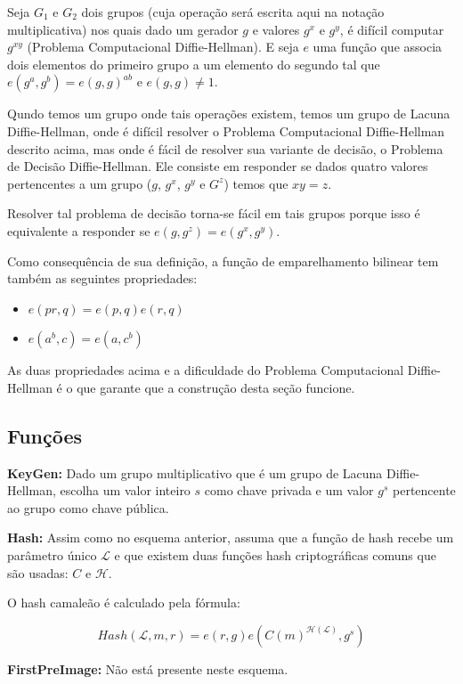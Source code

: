 \documentclass[a4paper]{article}
\begin{document}
Seja $G_1$ e $G_2$ dois grupos (cuja operação será escrita aqui na
notação multiplicativa) nos quais dado um gerador $g$ e valores $g^x$
e $g^y$, é difícil computar $g^{xy}$ (Problema Computacional
Diffie-Hellman). E seja $e$ uma função que associa dois elementos do
primeiro grupo a um elemento do segundo tal que $e(g^a, g^b) = e(g,
g)^{ab}$ e $e(g, g) \neq 1$.

Qundo temos um grupo onde tais operações existem, temos um grupo de
Lacuna Diffie-Hellman, onde é difícil resolver o Problema
Computacional Diffie-Hellman descrito acima, mas onde é fácil de
resolver sua variante de decisão, o Problema de Decisão
Diffie-Hellman. Ele consiste em responder se dados quatro valores
pertencentes a um grupo ($g$, $g^x$, $g^y$ e $G^z$) temos que $xy=z$.

Resolver tal problema de decisão torna-se fácil em tais grupos porque
isso é equivalente a responder se $e(g, g^z) = e(g^x, g^y)$.

Como consequência de sua definição, a função de emparelhamento
bilinear tem também as seguintes propriedades:

\begin{itemize}
\item$e(pr, q) = e(p, q)e(r, q)$
\item$e(a^b, c) = e(a, c^b)$
\end{itemize}

As duas propriedades acima e a dificuldade do Problema Computacional
Diffie-Hellman é o que garante que a construção desta seção funcione.

\subsection{Funções}

\textbf{KeyGen: }Dado um grupo multiplicativo que é um grupo de Lacuna
Diffie-Hellman, escolha um valor inteiro $s$ como chave privada e um
valor $g^s$ pertencente ao grupo como chave pública.

\textbf{Hash: } Assim como no esquema anterior, assuma que a função de
hash recebe um parâmetro único $\mathcal{L}$ e que existem duas
funções hash criptográficas comuns que são usadas: $C$ e
$\mathcal{H}$.

O hash camaleão é calculado  pela fórmula:

$$
Hash(\mathcal{L}, m, r) = e(r, g)e(C(m)^{\mathcal{H}(\mathcal{L})}, g^s)
$$

\textbf{FirstPreImage:} Não está presente neste esquema.
\end{document}
